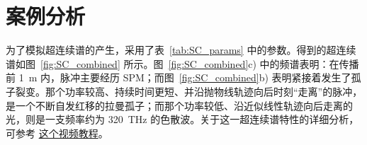 \begin{table}[]
\end{table}
\section{案例分析}
为了模拟超连续谱的产生，采用了表~\ref{tab:SC_params} 中的参数。得到的超连续谱如图~\ref{fig:SC_combined} 所示。图~\ref{fig:SC_combined}c) 中的频谱表明：在传播前 1~m 内，脉冲主要经历 SPM；而图~\ref{fig:SC_combined}b) 表明紧接着发生了孤子裂变。那个功率较高、持续时间更短、并沿抛物线轨迹向后时刻“走离”的脉冲，是一个不断自发红移的拉曼孤子；而那个功率较低、沿近似线性轨迹向后走离的光，则是一支频率约为 320~THz 的色散波。关于这一超连续谱特性的详细分析，可参考 \href{https://youtu.be/-GDsMDpC3oA}{这个视频教程}。

